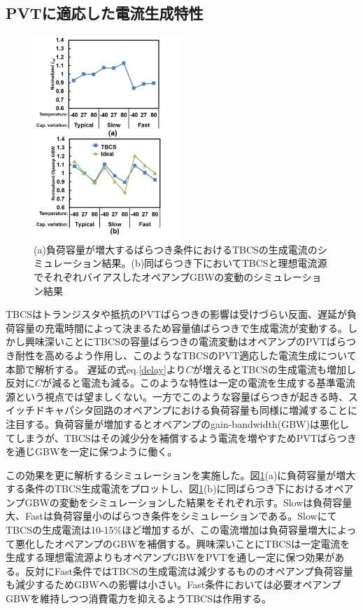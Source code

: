 \documentclass[letterpaper, 10 pt, conference]{ieeeconf}  %
\begin{document}
\subsection{PVTに適応した電流生成特性}
\begin{figure}[!]
\centering
 \includegraphics[width=0.5\textwidth]{figs/iref_var.png}
  \caption{(a)負荷容量が増大するばらつき条件におけるTBCSの生成電流のシミュレーション結果。(b)同ばらつき下においてTBCSと理想電流源でそれぞれバイアスしたオペアンプGBWの変動のシミュレーション結果}
\label{cvar}
\end{figure}

TBCSはトランジスタや抵抗のPVTばらつきの影響は受けづらい反面、遅延が負荷容量の充電時間によって決まるため容量値ばらつきで生成電流が変動する。しかし興味深いことにTBCSの容量ばらつきの電流変動はオペアンプのPVTばらつき耐性を高めるよう作用し、このようなTBCSのPVT適応した電流生成について本節で解析する。
遅延の式eq.\ref{delay}より$C$が増えるとTBCSの生成電流も増加し反対に$C$が減ると電流も減る。このような特性は一定の電流を生成する基準電流源という視点では望ましくない。一方でこのような容量ばらつきが起きる時、スイッチドキャパシタ回路のオペアンプにおける負荷容量も同様に増減することに注目する。負荷容量が増加するとオペアンプのgain-bandwidth(GBW)は悪化してしまうが、TBCSはその減少分を補償するよう電流を増やすためPVTばらつきを通じGBWを一定に保つように働く。

この効果を更に解析するシミュレーションを実施した。図\ref{cvar}(a)に負荷容量が増大する条件のTBCS生成電流をプロットし、図\ref{cvar}(b)に同ばらつき下におけるオペアンプGBWの変動をシミュレーションした結果をそれぞれ示す。Slowは負荷容量大、Fastは負荷容量小のばらつき条件をシミュレーションである。SlowにてTBCSの生成電流は10-15\%ほど増加するが、この電流増加は負荷容量増大によって悪化したオペアンプのGBWを補償する。興味深いことにTBCSは一定電流を生成する理想電流源よりもオペアンプGBWをPVTを通し一定に保つ効果がある。反対にFast条件ではTBCSの生成電流は減少するもののオペアンプ負荷容量も減少するためGBWへの影響は小さい。Fast条件においては必要オペアンプGBWを維持しつつ消費電力を抑えるようTBCSは作用する。
\end{document}

